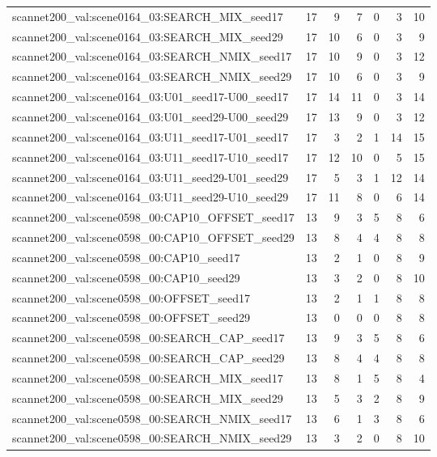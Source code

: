 \begin{table}[t]
\begin{tabular}{lrrrrrr}
scannet200\_val:scene0164\_03:SEARCH\_MIX\_seed17 & 17 & 9 & 7 & 0 & 3 & 10 \\
scannet200\_val:scene0164\_03:SEARCH\_MIX\_seed29 & 17 & 10 & 6 & 0 & 3 & 9 \\
scannet200\_val:scene0164\_03:SEARCH\_NMIX\_seed17 & 17 & 10 & 9 & 0 & 3 & 12 \\
scannet200\_val:scene0164\_03:SEARCH\_NMIX\_seed29 & 17 & 10 & 6 & 0 & 3 & 9 \\
scannet200\_val:scene0164\_03:U01\_seed17-U00\_seed17 & 17 & 14 & 11 & 0 & 3 & 14 \\
scannet200\_val:scene0164\_03:U01\_seed29-U00\_seed29 & 17 & 13 & 9 & 0 & 3 & 12 \\
scannet200\_val:scene0164\_03:U11\_seed17-U01\_seed17 & 17 & 3 & 2 & 1 & 14 & 15 \\
scannet200\_val:scene0164\_03:U11\_seed17-U10\_seed17 & 17 & 12 & 10 & 0 & 5 & 15 \\
scannet200\_val:scene0164\_03:U11\_seed29-U01\_seed29 & 17 & 5 & 3 & 1 & 12 & 14 \\
scannet200\_val:scene0164\_03:U11\_seed29-U10\_seed29 & 17 & 11 & 8 & 0 & 6 & 14 \\
scannet200\_val:scene0598\_00:CAP10\_OFFSET\_seed17 & 13 & 9 & 3 & 5 & 8 & 6 \\
scannet200\_val:scene0598\_00:CAP10\_OFFSET\_seed29 & 13 & 8 & 4 & 4 & 8 & 8 \\
scannet200\_val:scene0598\_00:CAP10\_seed17 & 13 & 2 & 1 & 0 & 8 & 9 \\
scannet200\_val:scene0598\_00:CAP10\_seed29 & 13 & 3 & 2 & 0 & 8 & 10 \\
scannet200\_val:scene0598\_00:OFFSET\_seed17 & 13 & 2 & 1 & 1 & 8 & 8 \\
scannet200\_val:scene0598\_00:OFFSET\_seed29 & 13 & 0 & 0 & 0 & 8 & 8 \\
scannet200\_val:scene0598\_00:SEARCH\_CAP\_seed17 & 13 & 9 & 3 & 5 & 8 & 6 \\
scannet200\_val:scene0598\_00:SEARCH\_CAP\_seed29 & 13 & 8 & 4 & 4 & 8 & 8 \\
scannet200\_val:scene0598\_00:SEARCH\_MIX\_seed17 & 13 & 8 & 1 & 5 & 8 & 4 \\
scannet200\_val:scene0598\_00:SEARCH\_MIX\_seed29 & 13 & 5 & 3 & 2 & 8 & 9 \\
scannet200\_val:scene0598\_00:SEARCH\_NMIX\_seed17 & 13 & 6 & 1 & 3 & 8 & 6 \\
scannet200\_val:scene0598\_00:SEARCH\_NMIX\_seed29 & 13 & 3 & 2 & 0 & 8 & 10 \\

\end{tabular}
\end{table}
